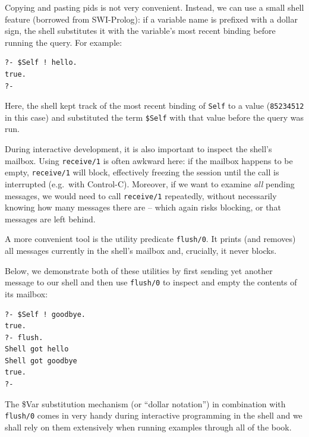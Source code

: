 \noindent Copying and pasting pids is not very convenient. Instead, we can use a small shell feature (borrowed from SWI-Prolog): if a variable name is prefixed with a dollar sign, the shell substitutes it with the variable's most recent binding before running the query. For example:

\begin{verbatim}
?- $Self ! hello.
true.
?-
\end{verbatim}

\noindent Here, the shell kept track of the most recent binding of \texttt{Self} to a value (\texttt{85234512} in this case) and substituted the term \texttt{\$Self} with that value before the query was run.

\medskip

\noindent During interactive development, it is also important to inspect the shell's mailbox. Using \texttt{receive/1} is often awkward here: if the mailbox happens to be empty, \texttt{receive/1} will block, effectively freezing the session until the call is interrupted (e.g.\ with Control-C). Moreover, if we want to examine \emph{all} pending messages, we would need to call \texttt{receive/1} repeatedly, without necessarily knowing how many messages there are -- which again risks blocking, or that messages are left behind.

A more convenient tool is the utility predicate \texttt{flush/0}. It prints (and removes) all messages currently in the shell's mailbox and, crucially, it never blocks.

Below, we demonstrate both of these utilities by first sending yet another message to our shell and then use \texttt{flush/0} to inspect and empty the contents of its mailbox:

\begin{verbatim}
?- $Self ! goodbye.
true.
?- flush.
Shell got hello
Shell got goodbye
true.
?-
\end{verbatim}

\noindent The \$Var substitution mechanism (or ``dollar notation'') in combination with \texttt{flush/0} comes in very handy during interactive programming in the shell and we shall rely on them extensively when running examples through all of the book.

